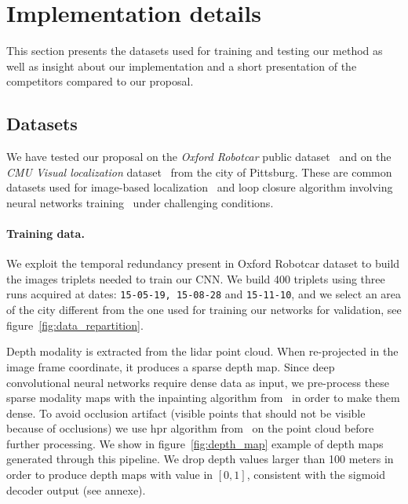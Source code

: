 \section{Implementation details}
\label{sec:impl_details}

This section presents the datasets used for training and testing our method as well as insight about our implementation and a short presentation of the competitors compared to our proposal.

\subsection{Datasets}
\label{subsec:dataset}
	We have tested our proposal on the \textit{Oxford Robotcar} public dataset~\citep{Maddern2016} and on the \textit{CMU Visual localization} dataset~\citep{Bansal2014a} from the city of Pittsburg. These are common datasets used for image-based localization~\citep{Sattler2018} and loop closure algorithm involving neural networks training~\citep{Porav2018} under challenging conditions.
		
\paragraph{Training data.}
\label{para:training_data}

We exploit the temporal redundancy present in Oxford Robotcar dataset to build the images triplets needed to train our CNN. We build 400 triplets using three runs acquired at dates: \texttt{15-05-19, 15-08-28} and \texttt{15-11-10}, and we select an area of the city different from the one used for training our networks for validation, see figure~\ref{fig:data_repartition}.


Depth modality is extracted from the lidar point cloud. When re-projected in the image frame coordinate, it produces a sparse depth map. Since deep convolutional neural networks require dense data as input, we pre-process these sparse modality maps with the inpainting algorithm from~\citep{Bevilacqua2017} in order to make them dense. To avoid occlusion artifact (visible points that should not be visible because of occlusions) we use \ac{hpr} algorithm from~\citet{Katz2007} on the point cloud before further processing. We show in figure~\ref{fig:depth_map} example of depth maps generated through this pipeline. We drop depth values larger than 100 meters in order to produce depth maps with value in $[0, 1]$, consistent with the sigmoid decoder output (see annexe).

